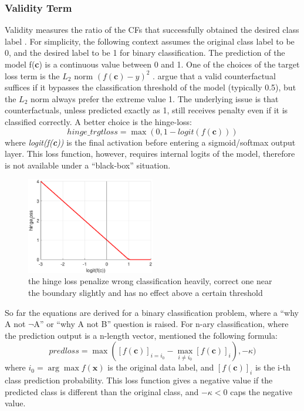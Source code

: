 \subsubsection{Validity Term} Validity measures the ratio of the CFs that successfully obtained the desired class label \cite{CFReview}. For simplicity, the following context assumes the original class label to be 0, and the desired label to be 1 for binary classification. The prediction of the model f(\textbf{c}) is a continuous value between 0 and 1. One of the choices of the target loss term is the \emph{$L_2$} norm $(f(\textbf{c})-y)^2$ \cite{watcher2017}. \citeauthor{DiCE} \cite{DiCE} argue that a valid counterfactual suffices if it bypasses the classification threshold of the model (typically 0.5), but the \emph{$L_2$} norm always prefer the extreme value 1. The underlying issue is that counterfactuals, unless predicted exactly as 1, still receives penalty even if it is classified correctly. A better choice is the hinge-loss:
\begin{equation}\label{eq:hingeloss}
  hinge\_trgtloss=\max(0,1-logit(f(\textbf{c})))
\end{equation}
where \emph{logit(f(\textbf{c}))} is the final activation before entering a sigmoid/softmax output layer. This loss function, however, requires internal logits of the model, therefore is not available under a ``black-box'' situation.
\begin{figure}
  \centering
  \includegraphics[width=0.5\textwidth]{hingeloss.eps}
  \caption{the hinge loss penalize wrong classification heavily, correct one near the boundary slightly and has no effect above a certain threshold}\label{fig:hingeloss}
\end{figure}

So far the equations are derived for a binary classification problem, where a ``why A not $\neg${A}'' or ``why A not B'' question is raised. For n-ary classification, where the prediction output is a n-length vector, \citeauthor{prototype} \cite{prototype} mentioned the following formula:
\begin{equation}\label{eq:lossPred}
  predloss=\max([f(\textbf{c})]_{i=i_0}-\max_{i\neq i_0}[f(\textbf{c})]_i),-\kappa)
\end{equation}
where $i_0=\arg\max f(\textbf{x})$ is the original data label, and $[f(\textbf{c})]_i$ is the i-th class prediction probability. This loss function gives a negative value if the predicted class is different than the original class, and $-\kappa < 0$ caps the negative value.

